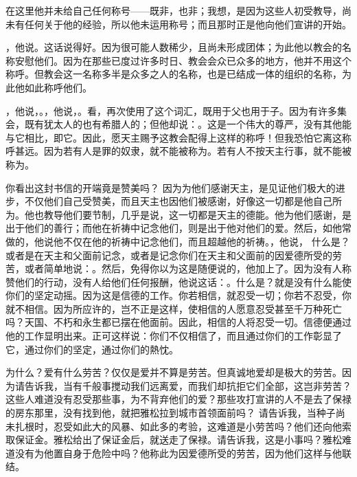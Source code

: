  在这里他并未给自己任何称号——既非，也非；我想，是因为这些人初受教导，尚未有任何关于他的经验，所以他未运用称号；而且那时正是他向他们宣讲的开始。\par

，他说。这话说得好。因为很可能人数稀少，且尚未形成团体；为此他以教会的名称安慰他们。因为在那些已度过许多时日、教会会众已众多的地方，他并不用这个称呼。但教会这一名称多半是众多之人的名称，也是已结成一体的组织的名称，为此他如此称呼他们。\par

，他说，。，他说，。看，再次使用了这个词汇，既用于父也用于子。因为有许多集会，既有犹太人的也有希腊人的；但他却说：。这是一个伟大的尊严，没有其他能与它相比，即它。因此，愿天主赐予这教会配得上这样的称呼！但我恐怕它离这称呼甚远。因为若有人是罪的奴隶，就不能被称为。若有人不按天主行事，就不能被称为。\par

 你看出这封书信的开端竟是赞美吗？ 因为为他们感谢天主，是见证他们极大的进步，不仅他们自己受赞美，而且天主也因他们被感谢，好像这一切都是他自己所为。他也教导他们要节制，几乎是说，这一切都是天主的德能。他为他们感谢，是出于他们的善行；而他在祈祷中记念他们，则是出于他对他们的爱。然后，如他常做的，他说他不仅在他的祈祷中记念他们，而且超越他的祈祷。，他说， 什么是？或者是在天主和父面前记念，或者是记念你们在天主和父面前的因爱德所受的劳苦，或者简单地说：。然后，免得你以为这是随便说的，他加上了。因为没有人称赞他们的行动，没有人给他们任何报酬，他说这话：。什么是？就是没有什么能使你们的坚定动摇。因为这是信德的工作。你若相信，就忍受一切；你若不忍受，你就不相信。因为所应许的，岂不正是这样，使相信的人愿意忍受甚至千万种死亡吗？天国、不朽和永生都已摆在他面前。因此，相信的人将忍受一切。信德便通过他的工作显明出来。正可这样说：你们不仅相信了，而且通过你们的工作彰显了它，通过你们的坚定，通过你们的熱忱。\par

 为什么？爱有什么劳苦？仅仅是爱并不算是劳苦。但真诚地爱却是极大的劳苦。因为请告诉我，当有千般事搅动我们远离爱，而我们却抗拒它们全部，这岂非劳苦？这些人难道没有忍受那些事，为不背弃他们的爱？那些攻打宣讲的人不是去了保禄的房东那里，没有找到他，就把雅松拉到城市首领面前吗？ 请告诉我，当种子尚未扎根时，忍受如此大的风暴、如此多的考验，这难道是小劳苦吗？他们还向他索取保证金。雅松给出了保证金后，就送走了保禄。请告诉我，这是小事吗？雅松难道没有为他置自身于危险中吗？他称此为因爱德所受的劳苦，因为他们这样与他联结。\par

